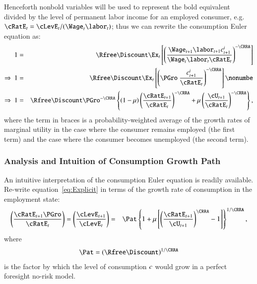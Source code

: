 \documentclass[titlepage,abstract]{\econtex}\newcommand{\texname}{ctDiscrete}
\begin{document}
Henceforth nonbold variables will be used to represent the bold equivalent divided by the level of permanent labor income for an employed consumer, e.g.\ $\cRatE_{t}=\cLevE_{t}/(\Wage_{t}\labor_{t})$; thus we can rewrite the consumption Euler equation as:%
\begin{eqnarray}
  1         & = & \Rfree\Discount \Ex_{t}\left[\left(\frac{\Wage_{t+1}\labor_{t+1}{c}^{i}_{t+1}}{\Wage_{t}\labor_{t}\cRatE_{t}}\right)^{-\CRRA} \right]
\nonumber%
\\
\Rightarrow \
  1        & = & \Rfree\Discount \Ex_{t}\left[\left(\PGro \ \frac{{c}^{i}_{t+1}}{\cRatE_{t}}\right)^{-\CRRA} \right] \nonumbe
\\
\Rightarrow \
  1        & = & \Rfree\Discount\PGro^{-\CRRA} \left\{(1-\urate)\left(\frac{\cRatE_{t+1}}{\cRatE_{t}}\right)^{-\CRRA}+\urate \left(\frac{\cU_{t+1}}{\cRatE_{t}}\right)^{-\CRRA}\right\}
\label{eq:Explicit}
,
\end{eqnarray}
where the term in braces is a probability-weighted average of the growth rates of marginal utility in the case where the consumer remains employed (the first term) and the case where the consumer becomes unemployed (the second term).


\subsubsection{Analysis and Intuition of Consumption Growth Path}


An intuitive interpretation of the consumption Euler equation is readily available. Re-write equation~\eqref{eq:Explicit} in terms of the growth rate of consumption in the employment state:
\begin{eqnarray}
  \left(\frac{\cRatE_{t+1} \PGro}{\cRatE_{t}}\right)  = \left(\frac{\cLevE_{t+1}}{\cLevE_{t}}\right) 
  & = & 
  \Pat \left\{1+\urate\left[\left(\frac{\cRatE_{t+1}}{\cU_{t+1}}\right)^{\CRRA}-1\right]\right\}^{1/\CRRA}
\label{eq:cedel}
,
\end{eqnarray}
where 
\begin{eqnarray}
\Pat = (\Rfree\Discount)^{1/\CRRA}
\label{eq:PatPGro}
\end{eqnarray}
is the factor by which the level of consumption $c$ would grow in a perfect foresight no-risk model. 
\end{document}
